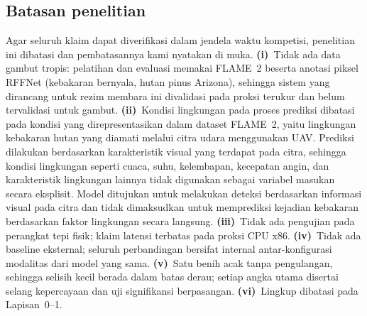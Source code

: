 \subsection{Batasan penelitian}
\label{sec:batasan}

Agar seluruh klaim dapat diverifikasi dalam jendela waktu kompetisi, penelitian
ini dibatasi dan pembatasannya kami nyatakan di muka. \textbf{(i)}~Tidak ada data
gambut tropis: pelatihan dan evaluasi memakai FLAME~2 beserta anotasi piksel
RFFNet (kebakaran bernyala, hutan pinus Arizona), sehingga sistem yang dirancang
untuk rezim membara ini divalidasi pada proksi terukur dan belum tervalidasi
untuk gambut. \textbf{(ii)}~Kondisi lingkungan pada proses prediksi dibatasi pada kondisi yang
direpresentasikan dalam dataset FLAME~2, yaitu lingkungan kebakaran hutan yang
diamati melalui citra udara menggunakan UAV. Prediksi dilakukan berdasarkan
karakteristik visual yang terdapat pada citra, sehingga kondisi lingkungan
seperti cuaca, suhu, kelembapan, kecepatan angin, dan karakteristik lingkungan
lainnya tidak digunakan sebagai variabel masukan secara eksplisit. Model
ditujukan untuk melakukan deteksi berdasarkan informasi visual pada citra dan
tidak dimaksudkan untuk memprediksi kejadian kebakaran berdasarkan faktor
lingkungan secara langsung. \textbf{(iii)}~Tidak ada pengujian pada perangkat
tepi fisik; klaim latensi terbatas pada proksi CPU x86. \textbf{(iv)}~Tidak ada
baseline eksternal; seluruh perbandingan bersifat internal antar-konfigurasi
modalitas dari model yang sama. \textbf{(v)}~Satu benih acak tanpa pengulangan,
sehingga selisih kecil berada dalam batas derau; setiap angka utama disertai
selang kepercayaan dan uji signifikansi berpasangan. \textbf{(vi)}~Lingkup
dibatasi pada Lapisan~0--1.
